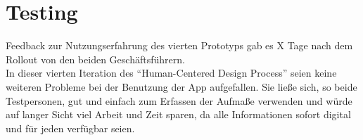 \section{Testing}
Feedback zur Nutzungserfahrung des vierten Prototyps gab es X Tage nach dem Rollout von den beiden Geschäftsführern. \\

In dieser vierten Iteration des ``Human-Centered Design Process'' seien keine weiteren Probleme bei der Benutzung der App aufgefallen.
Sie ließe sich, so beide Testpersonen, gut und einfach zum Erfassen der Aufmaße verwenden und würde auf langer Sicht viel Arbeit und Zeit sparen, da alle Informationen sofort digital und für jeden verfügbar seien.

